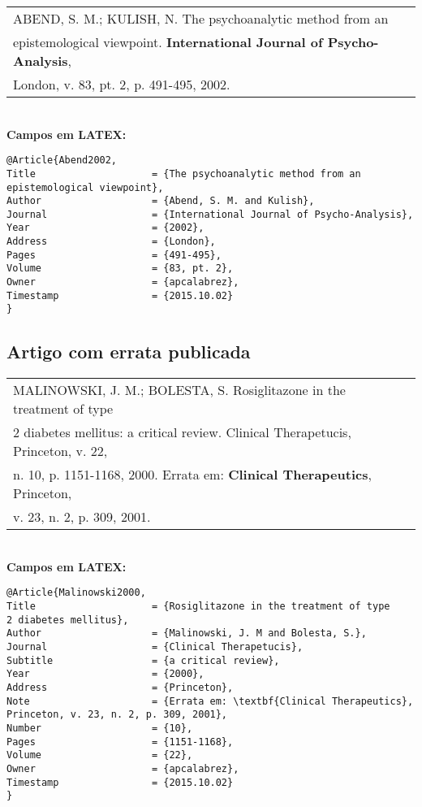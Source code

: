 \begin{tabular}{|l|c|} \hline
	ABEND, S. M.; KULISH, N. The psychoanalytic method from an\\
	epistemological viewpoint. \textbf{International Journal of Psycho-Analysis}, \\London, v. 83, pt. 2, p. 491-495, 2002. \\\hline
\end{tabular} \\

\textbf{Campos em LATEX:} 

\begin{verbatim}
@Article{Abend2002,
Title                    = {The psychoanalytic method from an 
epistemological viewpoint},
Author                   = {Abend, S. M. and Kulish},
Journal                  = {International Journal of Psycho-Analysis},
Year                     = {2002},
Address                  = {London},
Pages                    = {491-495},
Volume                   = {83, pt. 2},
Owner                    = {apcalabrez},
Timestamp                = {2015.10.02}
}
\end{verbatim}

\subsection{Artigo com errata publicada}

\begin{tabular}{|l|c|} \hline
	MALINOWSKI, J. M.; BOLESTA, S. Rosiglitazone in the treatment of
	type \\2 diabetes mellitus: a critical review. Clinical Therapetucis,
	Princeton, v. 22, \\n. 10, p. 1151-1168, 2000. Errata em: \textbf{Clinical
		Therapeutics}, Princeton, \\v. 23, n. 2, p. 309, 2001.
	\\\hline
\end{tabular} \\

\textbf{Campos em LATEX:} 

\begin{verbatim}
@Article{Malinowski2000,
Title                    = {Rosiglitazone in the treatment of type 
2 diabetes mellitus},
Author                   = {Malinowski, J. M and Bolesta, S.},
Journal                  = {Clinical Therapetucis},
Subtitle                 = {a critical review},
Year                     = {2000},
Address                  = {Princeton},
Note                     = {Errata em: \textbf{Clinical Therapeutics}, 
Princeton, v. 23, n. 2, p. 309, 2001},
Number                   = {10},
Pages                    = {1151-1168},
Volume                   = {22},
Owner                    = {apcalabrez},
Timestamp                = {2015.10.02}
}
\end{verbatim}

